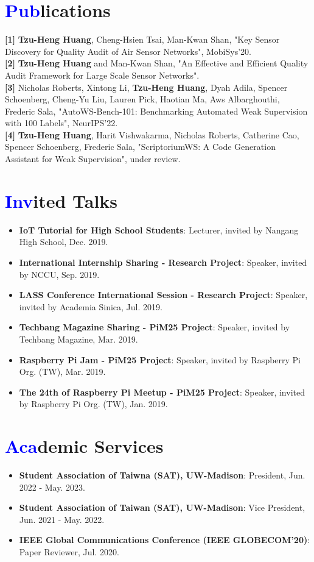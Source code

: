 \documentclass[letterpaper,11pt]{article}
\newcommand{\resumeItem}[2]{
  \item\small{
    \textbf{#1}{: #2 \vspace{-2pt}}
  }
}
\newcommand{\resumeSubItem}[2]{\resumeItem{#1}{#2}\vspace{-5pt}}
\newcommand{\resumeSubHeadingListStart}{\begin{itemize}[leftmargin=*]}
\newcommand{\resumeSubHeadingListEnd}{\end{itemize}}
\begin{document}
\section{\textbf{\textcolor{blue}{Pub}lications}}
{\textbf{[1]} \textbf{Tzu-Heng Huang}, Cheng-Hsien Tsai, Man-Kwan Shan, "Key Sensor Discovery for Quality Audit of Air Sensor Networks", MobiSys'20.} \\
{\textbf{[2]} \textbf{Tzu-Heng Huang} and Man-Kwan Shan, "An Effective and Efficient Quality Audit Framework for Large Scale Sensor Networks".} \\
{\textbf{[3]} Nicholas Roberts, Xintong Li, \textbf{Tzu-Heng Huang}, Dyah Adila, Spencer Schoenberg, Cheng-Yu Liu, Lauren Pick, Haotian Ma, Aws Albarghouthi, Frederic Sala, "AutoWS-Bench-101: Benchmarking Automated Weak Supervision with 100 Labels", NeurIPS'22.} \\
{\textbf{[4]} \textbf{Tzu-Heng Huang}, Harit Vishwakarma, Nicholas Roberts, Catherine Cao, Spencer Schoenberg, Frederic Sala, "ScriptoriumWS: A Code Generation Assistant for Weak Supervision", under review.}

\section{\textbf{\textcolor{blue}{Inv}ited Talks}}
  \resumeSubHeadingListStart
    \resumeSubItem{IoT Tutorial for High School Students}{Lecturer, invited by Nangang High School, Dec. 2019.}
    \resumeSubItem{International Internship Sharing - Research Project}{Speaker, invited by NCCU, Sep. 2019.}
    \resumeSubItem{LASS Conference International Session - Research Project}{Speaker, invited by Academia Sinica, Jul. 2019.}
    \resumeSubItem{Techbang Magazine Sharing - PiM25 Project}{Speaker, invited by Techbang Magazine, Mar. 2019.}
    \resumeSubItem{Raspberry Pi Jam - PiM25 Project}{Speaker, invited by Raspberry Pi Org. (TW), Mar. 2019.}
    \resumeSubItem{The 24th of Raspberry Pi Meetup - PiM25 Project}{Speaker, invited by Raspberry Pi Org. (TW), Jan. 2019.}
  \resumeSubHeadingListEnd

\section{\textbf{\textcolor{blue}{Aca}demic Services}}
  \resumeSubHeadingListStart
    \resumeSubItem{Student Association of Taiwna (SAT), UW-Madison}{President, Jun. 2022 - May. 2023.}
    \resumeSubItem{Student Association of Taiwan (SAT), UW-Madison}{Vice President, Jun. 2021 - May. 2022.}
    \resumeSubItem{IEEE Global Communications Conference (IEEE GLOBECOM'20)}{Paper Reviewer, Jul. 2020.}
  \resumeSubHeadingListEnd
\end{document}
